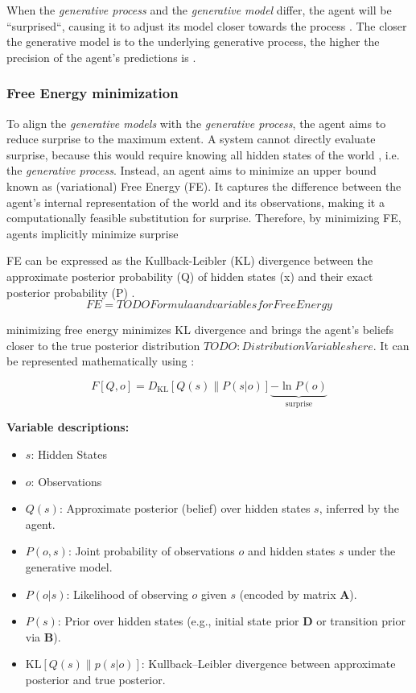 When the \textit{generative process} and the \textit{generative model} differ, the agent will be ``surprised``, causing it to adjust its model closer towards the process \cite{bruineberg_free-energy_2018}. The closer the generative model is to the underlying generative process, the higher the precision of the agent's predictions is \cite{sedlak_active_2024}.

\subsubsection{Free Energy minimization}
To align the \textit{generative models} with the \textit{generative process}, the agent aims to reduce surprise to the maximum extent. A system cannot directly evaluate surprise, because this would require knowing all hidden states of the world \cite{friston_free-energy_2009}, i.e. the \textit{generative process}. Instead, an agent aims to 
minimize an upper bound \cite{smith_step-by-step_2022} known as (variational) Free Energy (FE). It captures the difference between the agent's internal representation of the world and its observations, making it a computationally feasible substitution for surprise. Therefore, by minimizing FE, agents implicitly minimize surprise \cite{friston_free-energy_2010}

FE can be expressed as the Kullback-Leibler (KL) divergence between the approximate posterior probability (Q) of hidden states (x) and their exact posterior probability (P) \cite{sedlak_active_2024, sedlak_adaptive_2024,sajid_active_2021}. 
\[FE = TODO Formula and variables for Free Energy\]

 minimizing free energy minimizes KL divergence and brings the agent’s beliefs closer to the true posterior distribution \(TODO: Distribution Variables here\). It can be represented mathematically using \cite{parr_active_2022}:


\begin{equation}
F\left[Q, o\right] = D_\mathrm{{KL}}[Q(s) \parallel P(s|o)] \underbrace{ - \ln P(o)}_{\text{surprise}}
\end{equation}


\textbf{Variable descriptions:}
\begin{itemize}
  \item $s$: Hidden States
  \item $o$: Observations
  \item $Q(s)$: Approximate posterior (belief) over hidden states $s$, inferred by the agent.
  \item $P(o, s)$: Joint probability of observations $o$ and hidden states $s$ under the generative model.
  \item $P(o|s)$: Likelihood of observing $o$ given $s$ (encoded by matrix $\mathbf{A}$).
  \item $P(s)$: Prior over hidden states (e.g., initial state prior $\mathbf{D}$ or transition prior via $\mathbf{B}$).
  \item $\mathrm{KL}[Q(s) \parallel p(s|o)]$: Kullback--Leibler divergence between approximate posterior and true posterior.
\end{itemize}


